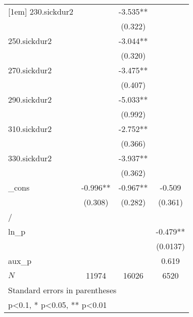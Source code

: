 \begin{table}[htbp]
\begin{tabular}{l*{3}{c}}
[1em]
230.sickdur2&              &      -3.535**&              \\
            &              &     (0.322)  &              \\
[1em]
250.sickdur2&              &      -3.044**&              \\
            &              &     (0.320)  &              \\
[1em]
270.sickdur2&              &      -3.475**&              \\
            &              &     (0.407)  &              \\
[1em]
290.sickdur2&              &      -5.033**&              \\
            &              &     (0.992)  &              \\
[1em]
310.sickdur2&              &      -2.752**&              \\
            &              &     (0.366)  &              \\
[1em]
330.sickdur2&              &      -3.937**&              \\
            &              &     (0.362)  &              \\
[1em]
\_cons      &      -0.996**&      -0.967**&      -0.509  \\
            &     (0.308)  &     (0.282)  &     (0.361)  \\
\hline
/           &              &              &              \\
ln\_p        &              &              &      -0.479**\\
            &              &              &    (0.0137)  \\
\hline
aux\_p       &              &              &       0.619  \\
\(N\)       &       11974  &       16026  &        6520  \\
\hline\hline
\multicolumn{4}{l}{\footnotesize Standard errors in parentheses}\\
\multicolumn{4}{l}{\footnotesize * p<0.1, * p<0.05, ** p<0.01}\\
\end{tabular}
\end{table}
